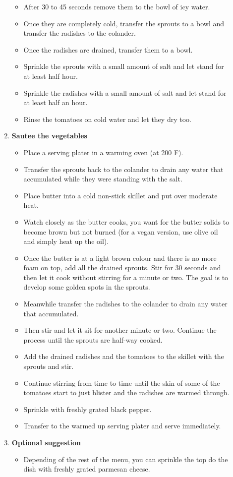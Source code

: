 \documentclass[11pt,letterpaper]{article}
\begin{document}
\begin{description}
\begin{enumerate}
\begin{itemize}
	\item After 30 to 45 seconds remove them to the bowl of icy water.
	\item Once they are completely cold, transfer the sprouts to a bowl and transfer the radishes to the colander.
	\item Once the radishes are drained, transfer them to a bowl.
	\item Sprinkle the sprouts with a small amount of salt and let stand for at least half hour.
	\item Sprinkle the radishes with a small amount of salt and let stand for at least half an hour.
	\item Rinse the tomatoes on cold water and let they dry too.
	\end{itemize}
	\item {\bf Sautee the vegetables}
	\begin{itemize}
	\item Place a serving plater in a warming oven (at 200 F).
	\item Transfer the sprouts back to the colander to drain any water that accumulated while they were standing with the salt.
	\item Place butter into a cold non-stick skillet and put over moderate heat.
	\item Watch closely as the butter cooks, you want for the butter solids to become brown but not burned (for a vegan version, use olive oil and simply heat up the oil).
	\item Once the butter is at a light brown colour and there is no more foam on top, add all the drained sprouts. Stir for 30 seconds and then let it cook without stirring for a minute or two. The goal is to develop some golden spots in the sprouts. 
	\item Meanwhile transfer the radishes to the colander to drain any water that accumulated.
	\item Then stir and let it sit for another minute or two. Continue the process until the sprouts are half-way cooked.
	\item Add the drained radishes and the tomatoes to the skillet with the sprouts and stir.
	\item Continue stirring from time to time until the skin of some of the tomatoes start to just blister and the radishes are warmed through.
	\item Sprinkle with freshly grated black pepper.
	\item Transfer to the warmed up serving plater and serve immediately.
	\end{itemize}
	\item {\bf Optional suggestion}
	\begin{itemize}
	\item Depending of the rest of the menu, you can sprinkle the top do the dish with freshly grated parmesan cheese.
	\end{itemize}
	\end{enumerate}
\end{description}
\end{document}
